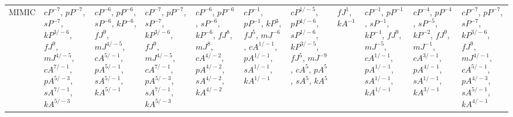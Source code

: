 \documentclass[letterpaper]{article} %
\begin{document}
\begin{sidewaystable*}
\begin{tabular}{l l l l l l l l l l l }
\multirow{10}{1.7cm}{MIMIC} & \multirow{10}{1.7cm}{$cP^{-7}$, $pP^{-7}$, $sP^{-7}$, $kP^{3/-6}$, $fJ^{9}$, $mJ^{4/-5}$, $cA^{7/-1}$, $pA^{5/-3}$, $sA^{7/-1}$, $kA^{5/-3}$} & \multirow{10}{1.7cm}{$cP^{-6}$, $pP^{-6}$, $sP^{-6}$, $kP^{-6}$, $fJ^{9}$, $mJ^{4/-5}$, $cA^{5/-1}$, $pA^{5/-1}$, $sA^{5/-1}$, $kA^{5/-1}$} & \multirow{10}{1.7cm}{$cP^{-7}$, $pP^{-7}$, $sP^{-7}$, $kP^{3/-6}$, $fJ^{9}$, $mJ^{4/-5}$, $cA^{7/-1}$, $pA^{5/-3}$, $sA^{7/-1}$, $kA^{5/-3}$} & \multirow{10}{1.7cm}{$cP^{-6}$, $pP^{-6}$, $sP^{-6}$, $kP^{-6}$, $fJ^{8}$, $mJ^{8}$, $cA^{4/-2}$, $pA^{4/-2}$, $sA^{4/-2}$, $kA^{4/-2}$} & \multirow{10}{1.7cm}{$cP^{-1}$, $pP^{-1}$, $kP^{3}$, $fJ^{5}$, $mJ^{-6}$, $cA^{1/-1}$, $pA^{1/-1}$, $sA^{1/-1}$, $kA^{1/-1}$} & \multirow{10}{1.7cm}{$cP^{1/-5}$, $pP^{1/-6}$, $sP^{1/-6}$, $kP^{3/-5}$, $fJ^{5}$, $mJ^{-9}$, $cA^{5}$, $pA^{5}$, $sA^{5}$, $kA^{5}$} & \multirow{10}{1.7cm}{$fJ^{1}$, $kA^{-1}$} & \multirow{10}{1.7cm}{$cP^{-1}$, $pP^{-1}$, $sP^{-1}$, $kP^{-1}$, $fJ^{9}$, $mJ^{-5}$, $cA^{1/-1}$, $pA^{1/-1}$, $sA^{1/-1}$, $kA^{1/-1}$} & \multirow{10}{1.7cm}{$cP^{-4}$, $pP^{-4}$, $sP^{-5}$, $kP^{-2}$, $fJ^{9}$, $mJ^{-1}$, $cA^{3/-1}$, $pA^{4/-1}$, $sA^{1/-1}$, $kA^{3/-1}$} & \multirow{10}{1.7cm}{$cP^{-7}$, $pP^{-7}$, $sP^{-7}$, $kP^{3/-6}$, $fJ^{9}$, $mJ^{4/-1}$, $cA^{5/-1}$, $pA^{4/-3}$, $sA^{5/-1}$, $kA^{4/-1}$} \\ \\ \\ \\ \\ \\ \\ \\ \\ \\

\end{tabular}
\end{sidewaystable*}
\end{document}
